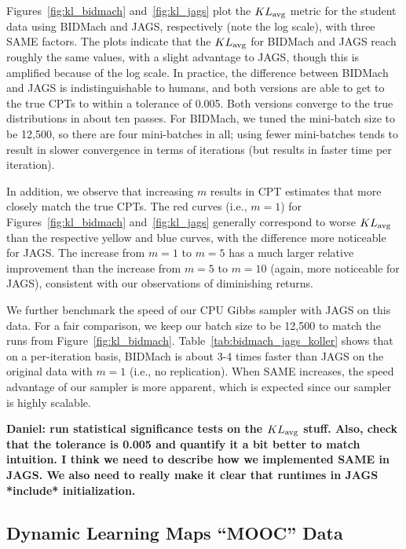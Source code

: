 \documentclass{article} %
\begin{document}
Figures~\ref{fig:kl_bidmach} and~\ref{fig:kl_jags} plot the $KL_{\rm avg}$ metric for the student
data using BIDMach and JAGS, respectively (note the log scale), with three SAME factors. The plots
indicate that the $KL_{\rm avg}$ for BIDMach and JAGS reach roughly the same values, with a slight
advantage to JAGS, though this is amplified because of the log scale. In practice, the difference
between BIDMach and JAGS is indistinguishable to humans, and both versions are able to get to the
true CPTs to within a tolerance of 0.005. Both versions converge to the true distributions in about
ten passes. For BIDMach, we tuned the mini-batch size to be 12,500, so there are four mini-batches
in all; using fewer mini-batches tends to result in slower convergence in terms of iterations (but
results in faster time per iteration).

In addition, we observe that increasing $m$ results in CPT estimates that more closely match the
true CPTs. The red curves (i.e., $m=1$) for Figures~\ref{fig:kl_bidmach} and~\ref{fig:kl_jags}
generally correspond to worse $KL_{\rm avg}$ than the respective yellow and blue curves, with the
difference more noticeable for JAGS. The increase from $m=1$ to $m=5$ has a much larger relative
improvement than the increase from $m=5$ to $m=10$ (again, more noticeable for JAGS), consistent
with our observations of diminishing returns.

We further benchmark the speed of our CPU Gibbs sampler with JAGS on this data. For a fair
comparison, we keep our batch size to be 12,500 to match the runs from Figure~\ref{fig:kl_bidmach}.
Table~\ref{tab:bidmach_jags_koller} shows that on a per-iteration basis, BIDMach is about 3-4 times
faster than JAGS on the original data with $m=1$ (i.e., no replication). When SAME increases, the
speed advantage of our sampler is more apparent, which is expected since our sampler is highly 
scalable.

\textbf{Daniel: run statistical significance tests on the $KL_{\rm avg}$ stuff. Also, check that the
tolerance is 0.005 and quantify it a bit better to match intuition. I think we need to describe how
we implemented SAME in JAGS. We also need to really make it clear that runtimes in JAGS *include*
initialization.}

\subsection{Dynamic Learning Maps ``MOOC'' Data}\label{ssec:mooc_data}
\end{document}
